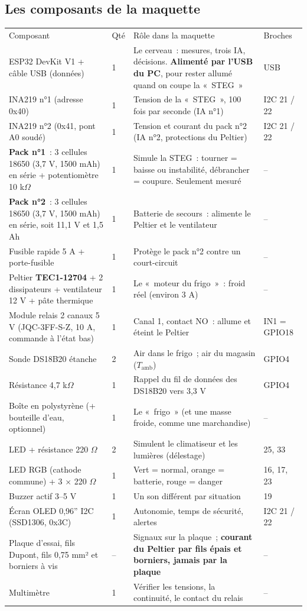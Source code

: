 \subsection{Les composants de la maquette}
\begin{tabularx}{\linewidth}{P{4.6cm}P{0.7cm}LP{2.1cm}}
 Composant & \mdseries Qté & \mdseries Rôle dans la maquette & \mdseries Broches \\
ESP32 DevKit V1 + câble USB (données) & 1 & Le cerveau~: mesures, trois IA, décisions. \textbf{Alimenté par l'USB du PC}, pour rester allumé quand on coupe la «~STEG~» & USB \\
INA219 n°1 (adresse 0x40) & 1 & Tension de la «~STEG~», 100 fois par seconde (IA n°1) & I2C 21 / 22 \\
INA219 n°2 (0x41, pont A0 soudé) & 1 & Tension et courant du pack n°2 (IA n°2, protections du Peltier) & I2C 21 / 22 \\
\textbf{Pack n°1}~: 3 cellules 18650 (3,7 V, 1500 mAh) en série + potentiomètre 10 k$\Omega$ & 1 & Simule la STEG~: tourner = baisse ou instabilité, débrancher = coupure. Seulement mesuré & -- \\
\textbf{Pack n°2}~: 3 cellules 18650 (3,7 V, 1500 mAh) en série, soit 11,1 V et 1,5 Ah & 1 & Batterie de secours~: alimente le Peltier et le ventilateur & -- \\
Fusible rapide 5 A + porte-fusible & 1 & Protège le pack n°2 contre un court-circuit & -- \\
Peltier \textbf{TEC1-12704} + 2 dissipateurs + ventilateur 12 V + pâte thermique & 1 & Le «~moteur du frigo~»~: froid réel (environ 3 A) & -- \\
Module relais 2 canaux 5 V (JQC-3FF-S-Z, 10 A, commande à l'état bas) & 1 & Canal 1, contact NO~: allume et éteint le Peltier & IN1 = GPIO18 \\
Sonde DS18B20 étanche & 2 & Air dans le frigo~; air du magasin ($T_{\text{amb}}$) & GPIO4 \\
Résistance 4,7 k$\Omega$ & 1 & Rappel du fil de données des DS18B20 vers 3,3 V & GPIO4 \\
Boîte en polystyrène (+ bouteille d'eau, optionnel) & 1 & Le «~frigo~» (et une masse froide, comme une marchandise) & -- \\
LED + résistance 220 $\Omega$ & 2 & Simulent le climatiseur et les lumières (délestage) & 25, 33 \\
LED RGB (cathode commune) + 3 $\times$ 220 $\Omega$ & 1 & Vert = normal, orange = batterie, rouge = danger & 16, 17, 23 \\
Buzzer actif 3--5 V & 1 & Un son différent par situation & 19 \\
Écran OLED 0,96'' I2C (SSD1306, 0x3C) & 1 & Autonomie, temps de sécurité, alertes & I2C 21 / 22 \\
Plaque d'essai, fils Dupont, fils 0,75 mm² et borniers à vis & -- & Signaux sur la plaque~; \textbf{courant du Peltier par fils épais et borniers, jamais par la plaque} & -- \\
Multimètre & 1 & Vérifier les tensions, la continuité, le contact du relais & -- \\
\end{tabularx}

